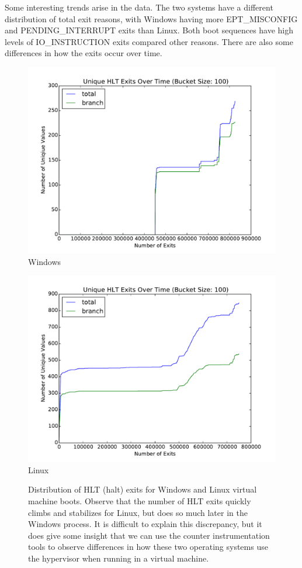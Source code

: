 \documentclass[notitlepage]{article}
\begin{document}
Some interesting trends arise in the data. The two systems have a different
distribution of total exit reasons, with Windows having more EPT\_MISCONFIG and
PENDING\_INTERRUPT exits than Linux. Both boot sequences have high levels of
IO\_INSTRUCTION exits compared other reasons. There are also some differences in
how the exits occur over time.

\begin{figure}[htpb!]
    \centering
    \begin{minipage}{.5\textwidth}
        \centering
        \includegraphics[width=1\textwidth]{hlt_windows.pdf}
        Windows
    \end{minipage}%
    \begin{minipage}{0.5\textwidth}
        \centering
        \includegraphics[width=1\textwidth]{hlt_linux.pdf}
        Linux
    \end{minipage}
    \caption{Distribution of HLT (halt) exits for Windows and Linux virtual machine
    boots. Observe that the number of HLT exits quickly climbs and stabilizes for
    Linux, but does so much later in the Windows process. It is difficult to explain
    this discrepancy, but it does give some insight that we can use the counter
    instrumentation tools to observe differences in how these two operating systems
    use the hypervisor when running in a virtual machine.}
    \label{fig:winlinhlt}
\end{figure}
\end{document}
